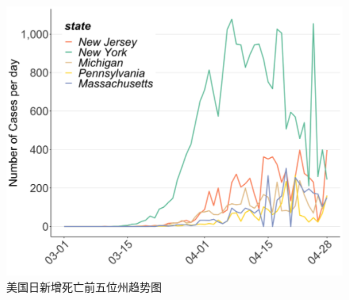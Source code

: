 \documentclass[
]{article}
\begin{document}
\begin{figure}[H]
\centering
{}
\caption{美国日新增死亡前五位州趋势图}
\includegraphics[]{./input/covid6.png}
\end{figure}
\end{document}
